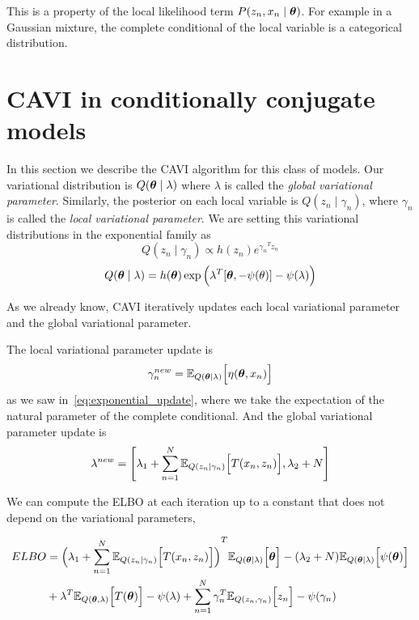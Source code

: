 This is a property of the local likelihood term \(P(z_{n}, x_{n} \mid \bm{\theta})\). For example in a Gaussian mixture, the complete conditional of the local variable is a categorical distribution.


\section{CAVI in conditionally conjugate models}

In this section we describe the CAVI algorithm for this class of models. Our variational distribution is \(Q(\bm{\theta} \mid \lambda)\) where \(\lambda\) is called the \emph{global variational parameter}. Similarly, the posterior on each local variable is \(Q(z_{n} \mid \gamma_{n})\), where \(\gamma_{n}\) is called the \emph{local variational parameter}.
We are setting this variational distributions in the exponential family as
\[
  Q(z_{n} \mid \gamma_{n}) \propto h(z_{n})e^{{\gamma_{n}}^{T}z_{n}}
\]
\[
  Q(\bm{\theta} \mid \lambda) = h(\bm{\theta}) \exp \Big( {\lambda}^{T}[\bm{\theta}, -\psi(\theta)] - \psi(\lambda) \Big)
\]

As we already know, CAVI iteratively updates each local variational parameter and the global variational parameter.

The local variational parameter update is
\[
  \gamma_{n}^{new} = \mathbb{E}_{Q(\bm{\theta} \mid \lambda)}\Big[\eta(\bm{\theta}, x_{n})\Big]
\]
as we saw in~\ref{eq:exponential_update}, where we take the expectation of the natural parameter of the complete conditional. And the global variational parameter update is
\[
  \lambda^{new} = \Bigg[ \lambda_{1} + \sum_{n=1}^{N} \mathbb{E}_{Q(z_{n}\mid \gamma_{n})}\Big[T(x_{n},z_{n})\Big], \lambda_{2} + N \Bigg]
\]

We can compute the ELBO at each iteration up to a constant that does not depend on the variational parameters,

\[
  \begin{aligned}
    ELBO &= {\Big( \lambda_{1} + \sum_{n=1}^{N} \mathbb{E}_{Q(z_{n}\mid \gamma_{n})}\Big[T(x_{n},z_{n})\Big]\Big)}^{T}\mathbb{E}_{Q(\bm{\theta} \mid \lambda)}\Big[\bm{\theta}\Big] - (\lambda_{2} + N) \mathbb{E}_{Q(\bm{\theta} \mid \lambda)}\Big[\psi(\bm{\theta})\Big]\\
    &+ \lambda ^{T} \mathbb{E}_{Q(\bm{\theta}, \lambda)}\Big[T(\bm{\theta})\Big] - \psi(\lambda) + \sum_{n=1}^{N}\gamma_{n}^{T}\mathbb{E}_{Q(z_{n}, \gamma_{n})}\Big[z_{n}\Big] - \psi(\gamma_{n})
  \end{aligned}
\]


